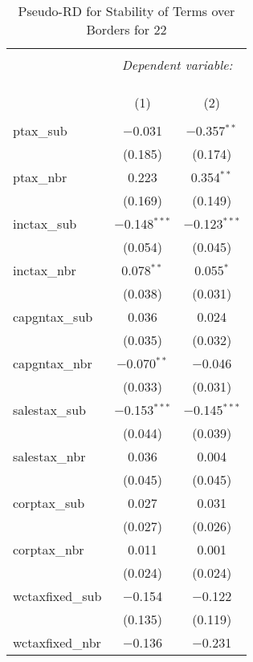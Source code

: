 
\begin{table}[!htbp] \centering 
  \caption{Pseudo-RD for Stability of Terms over Borders for  22} 
  \label{} 
\begin{tabular}{@{\extracolsep{5pt}}lcc} 
\\[-1.8ex]\hline 
\hline \\[-1.8ex] 
 & \multicolumn{2}{c}{\textit{Dependent variable:}} \\ 
\cline{2-3} 
\\[-1.8ex] & \multicolumn{2}{c}{ } \\ 
\\[-1.8ex] & (1) & (2)\\ 
\hline \\[-1.8ex] 
 ptax\_sub & $-$0.031 & $-$0.357$^{**}$ \\ 
  & (0.185) & (0.174) \\ 
  ptax\_nbr & 0.223 & 0.354$^{**}$ \\ 
  & (0.169) & (0.149) \\ 
  inctax\_sub & $-$0.148$^{***}$ & $-$0.123$^{***}$ \\ 
  & (0.054) & (0.045) \\ 
  inctax\_nbr & 0.078$^{**}$ & 0.055$^{*}$ \\ 
  & (0.038) & (0.031) \\ 
  capgntax\_sub & 0.036 & 0.024 \\ 
  & (0.035) & (0.032) \\ 
  capgntax\_nbr & $-$0.070$^{**}$ & $-$0.046 \\ 
  & (0.033) & (0.031) \\ 
  salestax\_sub & $-$0.153$^{***}$ & $-$0.145$^{***}$ \\ 
  & (0.044) & (0.039) \\ 
  salestax\_nbr & 0.036 & 0.004 \\ 
  & (0.045) & (0.045) \\ 
  corptax\_sub & 0.027 & 0.031 \\ 
  & (0.027) & (0.026) \\ 
  corptax\_nbr & 0.011 & 0.001 \\ 
  & (0.024) & (0.024) \\ 
  wctaxfixed\_sub & $-$0.154 & $-$0.122 \\ 
  & (0.135) & (0.119) \\ 
  wctaxfixed\_nbr & $-$0.136 & $-$0.231 \\ 

\end{tabular}
\end{table}
